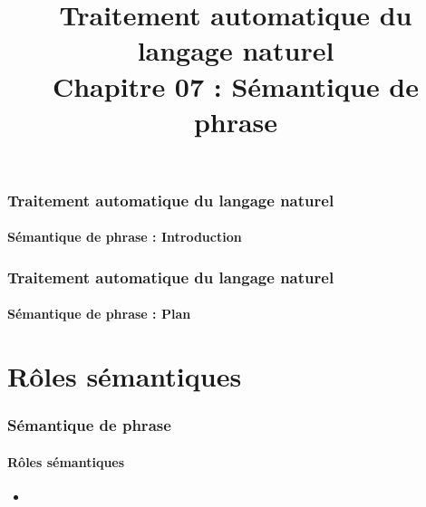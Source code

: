\documentclass[xcolor=table]{beamer}
\title[TALN : 07- Sémantique de phrase]%
{Traitement automatique du langage naturel\\Chapitre 07 : Sémantique de phrase}
\begin{document}
	
\begin{frame}
\frametitle{Traitement automatique du langage naturel}
\framesubtitle{Sémantique de phrase : Introduction}

%

\end{frame}

%
%

\begin{frame}
\frametitle{Traitement automatique du langage naturel}
\framesubtitle{Sémantique de phrase : Plan}

\begin{multicols}{2}
\tableofcontents
\end{multicols}
\end{frame}

\section{Rôles sémantiques}

\begin{frame}
\frametitle{Sémantique de phrase}
\framesubtitle{Rôles sémantiques}
	
	\begin{itemize}
		\item 
	\end{itemize}
	
\end{frame}
\end{document}
